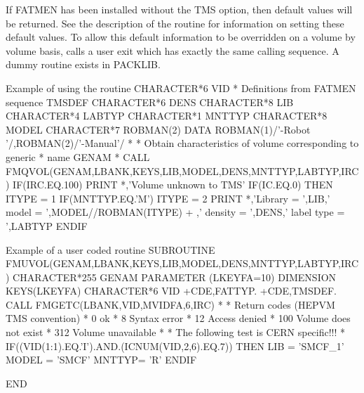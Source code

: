 \par
If FATMEN has been
installed without the TMS option, then default values
will be returned. See the description of the  routine
for information on setting these default values.
To allow this default information to be overridden on a volume
by volume basis,  calls a user exit  which has
exactly the same calling sequence. A dummy  routine
exists in PACKLIB.
\begin{XMPt}{Example of using the routine \protect{}}
      CHARACTER*6  VID
* Definitions from FATMEN sequence TMSDEF
      CHARACTER*6  DENS
      CHARACTER*8  LIB
      CHARACTER*4  LABTYP
      CHARACTER*1  MNTTYP
      CHARACTER*8  MODEL
      CHARACTER*7  ROBMAN(2)
      DATA         ROBMAN(1)/'-Robot '/,ROBMAN(2)/'-Manual'/
*
*     Obtain characteristics of volume corresponding to generic
*     name   GENAM
*
      CALL FMQVOL(GENAM,LBANK,KEYS,LIB,MODEL,DENS,MNTTYP,LABTYP,IRC)
      IF(IRC.EQ.100) PRINT *,'Volume unknown to TMS'
            IF(IC.EQ.0) THEN
              ITYPE = 1
              IF(MNTTYP.EQ.'M') ITYPE = 2
              PRINT *,'Library = ',LIB,' model = ',MODEL//ROBMAN(ITYPE)
     +               ,' density = ',DENS,' label type = ',LABTYP
              ENDIF
\end{XMPt}
\begin{XMPt}{Example of a user coded \protect{} routine}
      SUBROUTINE FMUVOL(GENAM,LBANK,KEYS,LIB,MODEL,DENS,MNTTYP,LABTYP,IRC)
      CHARACTER*255 GENAM
      PARAMETER     (LKEYFA=10)
      DIMENSION     KEYS(LKEYFA)
      CHARACTER*6 VID
+CDE,FATTYP.
+CDE,TMSDEF.
      CALL FMGETC(LBANK,VID,MVIDFA,6,IRC)
*
*     Return codes (HEPVM TMS convention)
*                   0   ok
*                   8   Syntax error
*                   12  Access denied
*                   100 Volume does not exist
*                   312 Volume unavailable
*
*     The following test is CERN specific!!!
*
      IF((VID(1:1).EQ.'I').AND.(ICNUM(VID,2,6).EQ.7)) THEN
         LIB = 'SMCF_1'
         MODEL = 'SMCF'
         MNTTYP= 'R'
      ENDIF

      END
\end{XMPt}
